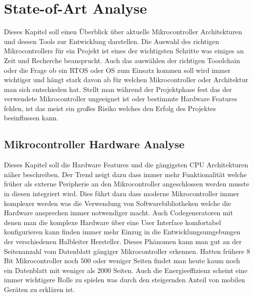 \documentclass[MES,Master,ngerman]{twbook}%
\begin{document}
{{{    \newcommand{\citefigm}[2]{(Source: taken with modification from \protect\cite{#1}, p. #2)}%
    \newcommand{\citep}{\citeasnoun}%
    \newcommand{\acessedthrough}{Available at:}%
    \newcommand{\acessedthroughp}{Available through:}%
    \newcommand{\acessedat}{Accessed}%
    \newcommand{\singlepage}{p.}%
    \newcommand{\multiplepages}{pp.}%
    \newcommand{\chapternr}{Ch.}%
    \renewcommand{\harvardand}{\&}%
    \newcommand{\abstractonly}{Abstract only}
    \newcommand{\edition}{~edition}%
}}}

\maketitle


%
%
\chapter{State-of-Art Analyse}
Dieses Kapitel soll einen Überblick über aktuelle Mikrocontroller Architekturen und dessen Tools zur Entwicklung darstellen. Die Auswahl des richtigen Mikrocontrollers für ein Projekt ist eines der wichtigsten Schritte was einiges an Zeit und Recherche beansprucht. Auch das auswählen der richtigen Tooolchain oder die Frage ob ein RTOS oder OS zum Einsatz kommen soll wird immer wichtiger und hängt stark davon ab für welchen Mikrocontroller oder Architektur man sich entschieden hat. Stellt man während der Projektphase fest das der verwendete Mikrocontroller ungeeignet ist oder bestimmte Hardware Features fehlen, ist das meist ein großes Risiko welches den Erfolg des Projektes beeinflussen kann.  
\section{Mikrocontroller Hardware Analyse}
Dieses Kapitel soll die Hardware Features und die gängigsten CPU Architekturen näher beschreiben. Der Trend neigt dazu dass immer mehr Funktionalität welche früher als externe Peripherie an den Mikrocontroller angeschlossen werden musste in diesen integriert wird. Dies führt dazu dass moderne Mikrocontroller immer komplexer werden was die Verwendung von Softwarebibliotheken welche die Hardware ansprechen immer notwendiger macht. Auch Codegeneratoren mit denen man die komplexe Hardware über eine User Interface komfortabel konfigurieren kann finden immer mehr Einzug in die Entwicklungsumgebungen der verschiedenen Halbleiter Hersteller. Dieses Phänomen kann man gut an der Seitenanzahl vom Datenblatt gängiger Mikrocontroller erkennen. Hatten frühere 8 Bit Mikrocontroller noch 500 oder weniger Seiten findet man heute kaum noch ein Datenblatt mit weniger als 2000 Seiten. Auch die Energieeffizienz scheint eine immer wichtigere Rolle zu spielen was durch den steigernden Anteil von mobilen Geräten zu erklären ist. 
\end{document}
